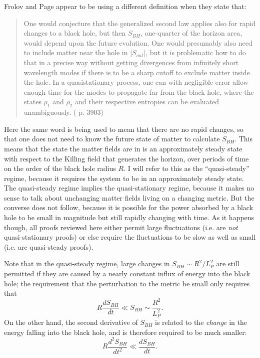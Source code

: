 \documentclass{article}
\begin{document}
Frolov and Page appear to be using a different definition when they state that:
\begin{quote}\small
One would conjecture that the generalized second law applies also for rapid changes to a black hole, but then $S_{BH}$, one-quarter of the horizon area, would depend upon the future evolution.  One would presumably also need to include matter near the hole in [$S_{out}$], but it is problematic how to do that in a precise way without getting divergences from infinitely short wavelength modes if there is to be a sharp cutoff to exclude matter inside the hole.  In a quasistationary process, one can with negligible error allow enough time for the modes to propagate far from the black hole, where the states $\rho_1$ and $\rho_2$ and their respective entropies can be evaluated unambiguously. (\cite{FP93} p. 3903)
\end{quote}
Here the same word is being used to mean that there are no rapid changes, so that one does not need to know the future state of matter to calculate $S_{BH}$.  This means that the state the matter fields are in is an approximately steady state with respect to the Killing field that generates the horizon, over periods of time on the order of the black hole radius $R$.  I will refer to this as the ``quasi-steady'' regime, because it requires the system to be in an approximately steady state.  The quasi-steady regime implies the quasi-stationary regime, because it makes no sense to talk about unchanging matter fields living on a changing metric.  But the converse does not follow, because it is possible for the power absorbed by a black hole to be small in magnitude but still rapidly changing with time.  As it happens though, all proofs reviewed here either permit large fluctuations (i.e. are \emph{not} quasi-stationary proofs) or else require the fluctuations to be slow as well as small (i.e. are quasi-steady proofs).

Note that in the quasi-steady regime, large changes in $S_{BH} \sim R^2/L_{P}^2$ are still permitted if they are caused by a nearly constant influx of energy into the black hole; the requirement that the perturbation to the metric be small only requires that
\begin{equation}\label{primus}
R \frac{dS_{BH}}{dt} \ll S_{BH} \sim \frac{R^2}{L_P^2}.
\end{equation}
On the other hand, the second derivative of $S_{BH}$ is related to the \emph{change} in the energy falling into the black hole, and is therefore required to be much smaller:
\begin{equation}\label{secundus}
R \frac{d^2 S_{BH}}{dt^2} \ll \frac{dS_{BH}}{dt}.
\end{equation}
\end{document}
